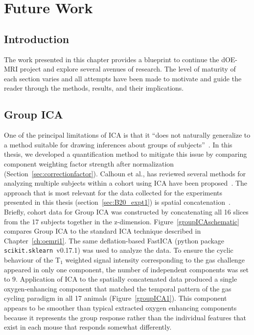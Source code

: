 
\chapter{Future Work}
\label{ch:futurework}

\section{Introduction}

The work presented in this chapter provides a blueprint to continue the \acs{dOE-MRI} project and explore several avenues of research.
The level of maturity of each section varies and all attempts have been made to motivate and guide the reader through the methods, results, and their implications.

\section{Group ICA}

One of the principal limitations of \acs{ICA} is that it ``does not naturally generalize to a method suitable for drawing inferences about groups of subjects''~\cite{Calhoun:2009jr}.
In this thesis, we developed a quantification method to mitigate this issue by comparing component weighting factor strength after normalization (Section~\ref{sec:correctionfactor}).
Calhoun et al., has reviewed several methods for analyzing multiple subjects within a cohort using \acs{ICA} have been proposed~\cite{Calhoun:2009jr}.
The approach that is most relevant for the data collected for the experiments presented in this thesis (section~\ref{sec:B20_expt1}) is spatial concatenation~\cite{Calhoun:2001jx}.
Briefly, cohort data for Group ICA was constructed by concatenating all 16 slices from the 17 subjects together in the z-dimension.
Figure~\ref{groupICAschematic} compares Group ICA to the standard ICA technique described in Chapter~\ref{ch:oemri1}.
The same deflation-based \acs{FastICA} (python package \texttt{scikit.sklearn}~v0.17.1) was used to analyze the data.
To ensure the cyclic behaviour of the T$_1$ weighted signal intensity corresponding to the gas challenge appeared in only one component, the number of independent components was set to 9.
Application of \acs{ICA} to the spatially concatenated data produced a single oxygen-enhancing component that matched the temporal pattern of the gas cycling paradigm in all 17 animals (Figure~\ref{groupICA1}). 
This component appears to be smoother than typical extracted oxygen enhancing components because it represents the group response rather than the individual features that exist in each mouse that responds somewhat differently.

